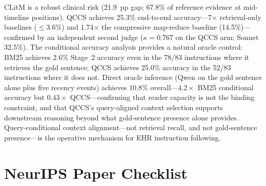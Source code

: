 \documentclass{article}
\begin{document}
CLitM is a robust clinical risk (21.9~pp gap; 67.8\% of reference evidence at
mid-timeline positions). QCCS achieves 25.3\% end-to-end accuracy---7$\times$
retrieval-only baselines ($\leq$3.6\%) and 1.74$\times$ the compressive map-reduce
baseline (14.5\%)---confirmed by an independent second judge ($\kappa = 0.767$
on the QCCS arm; Sonnet 32.5\%). The conditional accuracy
analysis provides a natural oracle control: BM25 achieves 2.6\% Stage~2 accuracy
even in the 78/83 instructions where it retrieves the gold sentence; QCCS achieves
25.0\% accuracy in the 52/83 instructions where it does not.
Direct oracle inference (Qwen on the gold sentence alone plus five recency events)
achieves 10.8\% overall---$4.2\times$ BM25 conditional accuracy but $0.43\times$
QCCS---confirming that reader capacity is not the binding constraint, and that
QCCS's query-aligned context selection supports downstream reasoning beyond what
gold-sentence presence alone provides.
Query-conditional context alignment---not retrieval recall, and not gold-sentence
presence---is the operative mechanism for EHR instruction following.




\newpage
\section*{NeurIPS Paper Checklist}
\end{document}
